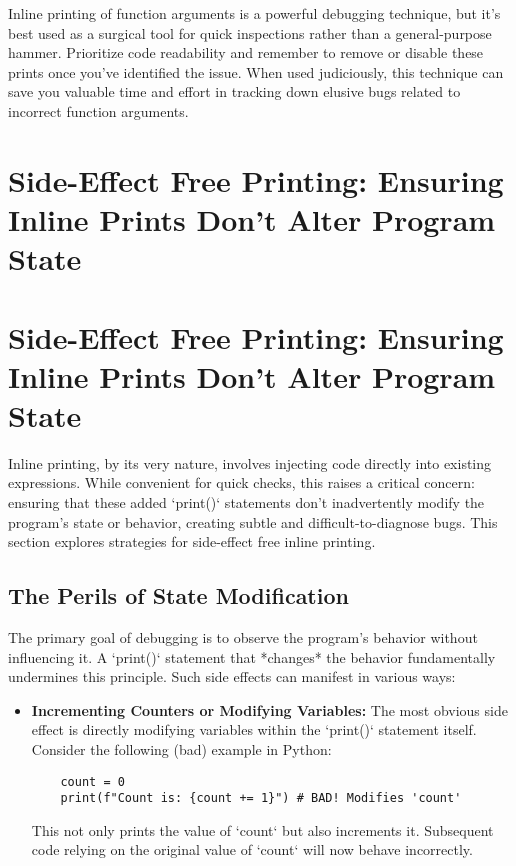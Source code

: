 \documentclass{article}
\begin{document}
{{{{Inline printing of function arguments is a powerful debugging technique, but it's best used as a surgical tool for quick inspections rather than a general-purpose hammer. Prioritize code readability and remember to remove or disable these prints once you've identified the issue. When used judiciously, this technique can save you valuable time and effort in tracking down elusive bugs related to incorrect function arguments.

\newpage

\section*{Side-Effect Free Printing: Ensuring Inline Prints Don't Alter Program State} %
\label{chapter-6-6-Side-Effect_Free_Printing__Ensuring_Inli}

\section*{Side-Effect Free Printing: Ensuring Inline Prints Don't Alter Program State}

Inline printing, by its very nature, involves injecting code directly into existing expressions. While convenient for quick checks, this raises a critical concern: ensuring that these added `print()` statements don't inadvertently modify the program's state or behavior, creating subtle and difficult-to-diagnose bugs. This section explores strategies for side-effect free inline printing.

\subsection*{The Perils of State Modification}

The primary goal of debugging is to observe the program's behavior without influencing it. A `print()` statement that *changes* the behavior fundamentally undermines this principle. Such side effects can manifest in various ways:

\begin{itemize}
    \item \textbf{Incrementing Counters or Modifying Variables:} The most obvious side effect is directly modifying variables within the `print()` statement itself.  Consider the following (bad) example in Python:
    \begin{verbatim}
    count = 0
    print(f"Count is: {count += 1}") # BAD! Modifies 'count'
    \end{verbatim}
    This not only prints the value of `count` but also increments it.  Subsequent code relying on the original value of `count` will now behave incorrectly.


\end{itemize}}}}}
\end{document}
